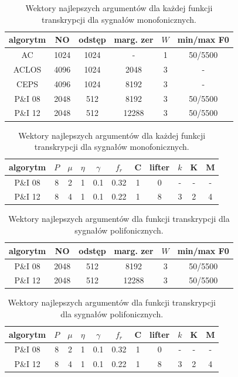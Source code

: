 \documentclass[12pt,a4paper,twoside]{mwart}
\begin{document}
\begin{table}[H]
  \begin{center}
    \begin{tabular}{ |c|c|c|c|c|c| } 
    \hline
    algorytm & NO & odstęp & marg. zer & $W$ & min/max F0  \\
    \hline
    AC & 1024 & 1024 & - & 1 &  50/5500  \\
    ACLOS & 4096 & 1024 & 2048 & 3 & -  \\
    CEPS & 4096 & 1024 & 8192 & 3 &- \\
    P\&I 08 & 2048 & 512 & 8192 & 3 & 50/5500 \\
    P\&I 12 & 2048 & 512 & 12288 & 3 & 50/5500 \\
    \hline
  \end{tabular}
\end{center}


\begin{center}
  \begin{tabular}{ |c|c|c|c|c|c|c|c|c|c|c| } 
    \hline
    algorytm & $P$ & \textit{$\mu$} & $\eta$  & $\gamma$ & $f_r$ & C & lifter & $k$ & K & M\\
    \hline
    P\&I 08 & 8 & 2 & 1  & 0.1& 0.32 & 1 & 0 & - & - & -\\
    P\&I 12 & 8 & 4 & 1  & 0.1& 0.22 & 1 & 8 & 3 & 2 & 4\\
    \hline
    \end{tabular}
  \caption{Wektory najlepszych argumentów dla każdej funkcji transkrypcji dla sygnałów monofonicznych.}\label{tab:bestArgMono}
  \end{center}
\end{table}

\begin{table}[H]
  \begin{center}
    \begin{tabular}{ |c|c|c|c|c|c| } 
      \hline
      algorytm & NO & odstęp & marg. zer & $W$ & min/max F0  \\
      \hline
      P\&I 08 & 2048 & 512 & 8192 & 3 & 50/5500 \\
      P\&I 12 & 2048 & 512 & 12288 & 3 & 50/5500 \\
      \hline
    \end{tabular}
  \end{center}


  \begin{center}
    \begin{tabular}{ |c|c|c|c|c|c|c|c|c|c|c| } 
      \hline
      algorytm & $P$ & \textit{$\mu$} & $\eta$  & $\gamma$ & $f_r$ & C & lifter & $k$ & K & M\\
      \hline
      P\&I 08 & 8 & 2 & 1  & 0.1& 0.32 & 1 & 0 & - & - & -\\
      P\&I 12 & 8 & 4 & 1  & 0.1& 0.22 & 1 & 8 & 3 & 2 & 4\\
      \hline
      \end{tabular}
  \end{center}
  \caption{Wektory najlepszych argumentów dla funkcji transkrypcji dla sygnałów polifonicznych.}
  \label{tab:bestArgPoli}
\end{table}
\end{document}
